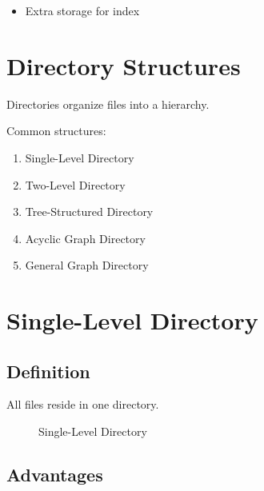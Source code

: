 \begin{itemize}
\item Extra storage for index
\end{itemize}

\section{Directory Structures}

Directories organize files into a hierarchy.

Common structures:

\begin{enumerate}
\item Single-Level Directory
\item Two-Level Directory
\item Tree-Structured Directory
\item Acyclic Graph Directory
\item General Graph Directory
\end{enumerate}

\section{Single-Level Directory}

\subsection{Definition}

All files reside in one directory.

\begin{figure}[h]
\centering
{}
\caption{Single-Level Directory}
\end{figure}

\subsection{Advantages}

